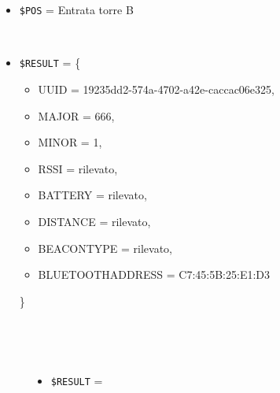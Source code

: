 \documentclass[../../SperimentazioniPratiche.tex]{subfiles}
\begin{document}
	
	\newpage
			\paragraph*{}		
			\label{Prova9A.1}
			\begin{tcolorbox}[fonttitle=\bfseries, 
								adjusted title={\Large Prova 9A.1}, 
								breakable, 
								sharp corners=south,
								colback=white, 
								colframe=white!60!black]
								
				\begin{description}[leftmargin=0.7cm,labelwidth=!]
				
					\item[Input] \ \par 
        				\begin{itemize}
        					\item \verb|$POS| = Entrata torre B
        				\end{itemize}
        				
        			\tcbline 
        				
        			\item[Output atteso] \ \par
        				\begin{itemize}
        					\item \verb|$RESULT| = \{
        					\begin{itemize}[label={}]
        						\item UUID = 19235dd2-574a-4702-a42e-caccac06e325,
								\item MAJOR = 666,
								\item MINOR = 1,
								\item RSSI = rilevato,
								\item BATTERY = rilevato,
								\item DISTANCE = rilevato,
								\item BEACONTYPE = rilevato,
								\item BLUETOOTHADDRESS = C7:45:5B:25:E1:D3
        					\end{itemize}
        					\}
        				\end{itemize}

					\tcbline        				
        				
        			\item[Output riscontrato] \ \par
        				\begin{description}
        				
        					\item[\dispositivoA] \ \par
        					\begin{itemize}
        						\item \verb|$RESULT| = \ok
        					\end{itemize}      					
        					

\end{description}
\end{description}
\end{tcolorbox}
\end{document}
